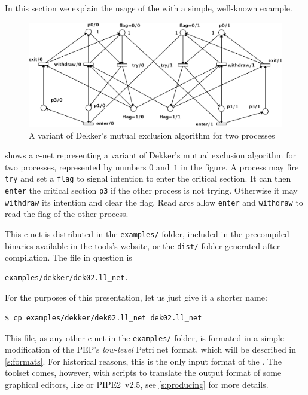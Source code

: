 \documentclass[a4paper]{refart}
\begin{document}
In this section we explain the usage of the \cunft{} with a simple, well-known
example.

\begin{figure}[h]
\centering
\includegraphics[scale=0.50]{fig/dekker2.pdf}
\caption{A variant of Dekker's mutual exclusion algorithm for two processes}
\label{f:dekker}
\end{figure}

 shows a c-net representing a variant of Dekker's mutual
exclusion algorithm for two processes, represented by numbers $0$ and~$1$
in the figure.
A process may fire \verb!try! and set a
\verb!flag! to signal intention to enter the critical section. 
It can then \verb!enter! the critical section \verb!p3!
if the other process is not trying.
Otherwise it may \verb!withdraw! its intention and clear the flag.  Read arcs
allow \verb!enter! and \verb!withdraw! to read the flag of the other process.

This c-net is distributed in the \verb!examples/! folder, included in the
precompiled binaries available in the tools's website, or the \verb!dist/!
folder generated after compilation.
The file in question is
\begin{verbatim}
examples/dekker/dek02.ll_net.
\end{verbatim}
For the purposes of this presentation, let us just give it a shorter name:
\begin{verbatim}
$ cp examples/dekker/dek02.ll_net dek02.ll_net
\end{verbatim}
This file, as any other c-net in the \verb!examples/! folder, is formated
in a simple modification of the PEP's \emph{low-level} Petri net
format, which will be described in \cref{s:formats}.
For historical reasons, this is the only input format of the \cunft{}.
The toolset comes, however, with
scripts to translate the output format of some graphical editors, like
\coloane\cite{Coloane} or PIPE2~v2.5\cite{BPK07}, see
\cref{s:producing} for more details.
\end{document}
